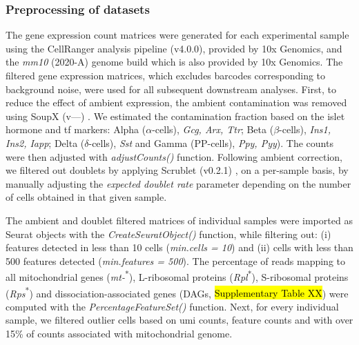 \subsubsection{\large Preprocessing of datasets}
\par The gene expression count matrices were generated for each experimental sample using the CellRanger analysis pipeline (v4.0.0), provided by 10x Genomics, and the \textit{mm10} (2020-A) genome build which is also provided by 10x Genomics. The filtered gene expression matrices, which excludes barcodes corresponding to background noise, were used for all subsequent downstream analyses. First, to reduce the effect of ambient expression, the ambient  contamination was removed using SoupX (v---) \textbf{\cite{young_soupx_2020}}. We estimated the contamination fraction based on the islet hormone and \acrfull{tf} markers: Alpha ($\alpha$-cells), \textit{Gcg, Arx, Ttr}; Beta ($\beta$-cells), \textit{Ins1, Ins2, Iapp}; Delta ($\delta$-cells), \textit{Sst} and Gamma (PP-cells), \textit{Ppy, Pyy}). The counts were then adjusted with \textit{adjustCounts()} function. Following ambient  correction, we filtered out doublets by applying Scrublet (v0.2.1) \textbf{\cite{wolock_scrublet_2019}}, on a per-sample basis, by manually adjusting the \textit{expected doublet rate} parameter depending on the number of cells obtained in that given sample.\\
\par The ambient  and doublet filtered matrices of individual samples were imported as Seurat objects with the \textit{CreateSeuratObject()} function, while filtering out: (i) features detected in less than 10 cells (\textit{min.cells = 10}) and (ii) cells with less than 500 features detected (\textit{min.features = 500}). The percentage of reads mapping to all mitochondrial genes (\textit{mt-}\textsuperscript{*}), L-ribosomal proteins (\textit{Rpl}\textsuperscript{*}), S-ribosomal proteins (\textit{Rps}\textsuperscript{*}) and dissociation-associated genes (DAGs, \hl{Supplementary Table XX}) were computed with the \textit{PercentageFeatureSet()} function. Next, for every individual sample, we filtered outlier cells based on \gls{umi} counts, feature counts and  with over 15\% of counts associated with mitochondrial genome.

